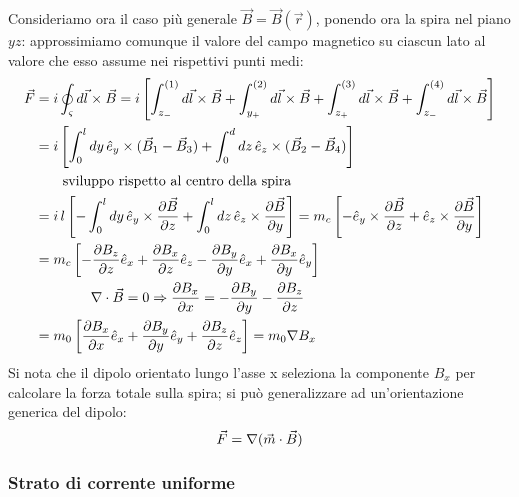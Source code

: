 Consideriamo ora il caso più generale $ \vec{B} = \vec{B}(\vec{r}) $, ponendo ora la spira nel piano $ yz $: approssimiamo comunque il valore del campo magnetico su ciascun lato al valore che esso assume nei rispettivi punti medi:
\begin{equation}
	\begin{split}
		\vec{F} &= i\oint_{\varsigma} d\vec{l}\times\vec{B} = i \left[ \int_{z_-}^{(1)} d\vec{l}\times\vec{B} + \int_{y_+}^{(2)} d\vec{l}\times\vec{B} + \int_{z_+}^{(3)} d\vec{l}\times\vec{B} + \int_{z_-}^{(4)} d\vec{l}\times\vec{B} \right] \\ 
			&= i \left[ \int_0^l dy \, \hat{e}_y \times (\vec{B}_1 - \vec{B}_3) + \int_0^d dz \, \hat{e}_z \times (\vec{B}_2 - \vec{B}_4) \right] \\ 
			& \qquad \text{sviluppo rispetto al centro della spira} \\
			&= i\,l\left[ - \int_0^l dy\, \hat{e}_y \times \displaystyle\frac{\partial\vec{B}}{\partial z} + \int_0^l dz\, \hat{e}_z \times \displaystyle\frac{\partial\vec{B}}{\partial y} \right] = m_c \left[ - \hat{e}_y \times \displaystyle\frac{\partial\vec{B}}{\partial z} + \hat{e}_z \times \displaystyle\frac{\partial\vec{B}}{\partial y} \right] \\ 
			&= m_c \left[ - \displaystyle\frac{\partial B_z}{\partial z} \hat{e}_x + \displaystyle\frac{\partial B_x}{\partial z} \hat{e}_z - \displaystyle\frac{\partial B_y}{\partial y} \hat{e}_x + \displaystyle\frac{\partial B_x}{\partial y} \hat{e}_y \right] \\ 
			& \qquad\qquad \nabla\cdot\vec{B} = 0 \Rightarrow \displaystyle\frac{\partial B_x}{\partial x} = - \displaystyle\frac{\partial B_y}{\partial y} - \displaystyle\frac{\partial B_z}{\partial z} \\ 
			&= m_0 \left[ \displaystyle\frac{\partial B_x}{\partial x} \hat{e}_x + \displaystyle\frac{\partial B_y}{\partial y} \hat{e}_y + \displaystyle\frac{\partial B_z}{\partial z} \hat{e}_z \right] = m_0 \nabla B_x
	\end{split}
	\label{eq:}
\end{equation}
Si nota che il dipolo orientato lungo l'asse x seleziona la componente $ B_x $ per calcolare la forza totale sulla spira; si può generalizzare ad un'orientazione generica del dipolo:
\begin{equation}
	\vec{F} = \nabla(\vec{m}\cdot\vec{B})
	\label{eq:for-sp-non-uni}
\end{equation}

\subsubsection{Strato di corrente uniforme}

